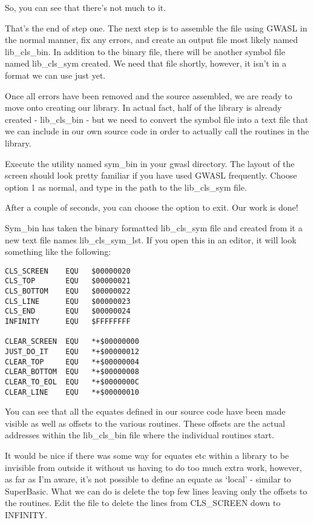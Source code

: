 So, you can see that there's not much to it. 

That's the end of step one. The next step is to assemble the file
    using GWASL in the normal manner, fix any
    errors, and create an output file most likely named
 lib\_cls\_bin. In addition to the binary file, there
    will be another symbol file named lib\_cls\_sym     created. We need that file shortly, however, it isn't in a format we can
    use just yet.

Once all errors have been removed and the source assembled, we are
    ready to move onto creating our library. In actual fact, half of the
    library is already created -{} lib\_cls\_bin -{} but we
    need to convert the symbol file into a text file that we can include in
    our own source code in order to actually call the routines in the
    library.

Execute the utility named sym\_bin in your
    gwasl directory. The layout of the screen should look pretty familiar if
    you have used GWASL frequently. Choose option 1
    as normal, and type in the path to the lib\_cls\_sym file.

After a couple of seconds, you can choose the option to exit. Our
    work is done!

Sym\_bin has taken the binary formatted
 lib\_cls\_sym file and created from it a new text file
    names lib\_cls\_sym\_lst. If you open this in an editor,
    it will look something like the following:

\begin{lstlisting}[firstnumber=1,caption={Example Library - Lib\_cls\_sym\_lst},label={lst:LibClsSymLst},language={}]
CLS_SCREEN    EQU   $00000020
CLS_TOP       EQU   $00000021
CLS_BOTTOM    EQU   $00000022
CLS_LINE      EQU   $00000023
CLS_END       EQU   $00000024
INFINITY      EQU   $FFFFFFFF

CLEAR_SCREEN  EQU   *+$00000000
JUST_DO_IT    EQU   *+$00000012
CLEAR_TOP     EQU   *+$00000004
CLEAR_BOTTOM  EQU   *+$00000008
CLEAR_TO_EOL  EQU   *+$0000000C
CLEAR_LINE    EQU   *+$00000010
\end{lstlisting}

You can see that all the equates defined in our source code have
    been made visible as well as offsets to the various routines. These
    offsets are the actual addresses within the
 lib\_cls\_bin file where the individual routines start.
 

It would be nice if there was some way for equates etc within a
    library to be invisible from outside it without us having to do too much
    extra work, however, as far as I'm aware, it's not possible to define an
    equate as `local' -{} similar to SuperBasic. What we can do is delete the
    top few lines leaving only the offsets to the routines. Edit the file to
    delete the lines from CLS\_SCREEN down to INFINITY. 

